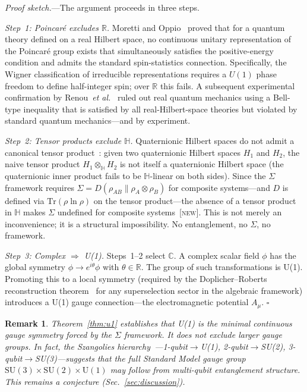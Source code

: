 \documentclass[prl,twocolumn,superscriptaddress,longbibliography]{revtex4-2}
\newtheorem*{remark}{Remark}
\newcommand{\Tr}{\mathrm{Tr}}
\newcommand{\new}{\textsc{[new]}}
\begin{document}
\textit{Proof sketch.}---The argument proceeds in three steps.

\textit{Step~1: Poincar\'{e} excludes $\mathbb{R}$.}
Moretti and Oppio~\cite{MorettiOppio2017,MorettiOppio2019}
proved that for a quantum theory defined on a real Hilbert space,
no continuous unitary representation of the Poincar\'{e} group
exists that simultaneously satisfies the positive-energy condition
and admits the standard spin-statistics connection.
Specifically, the Wigner classification of irreducible
representations requires a $U(1)$ phase freedom to define
half-integer spin; over $\mathbb{R}$ this fails.
A subsequent experimental confirmation by
Renou~\textit{et al.}~\cite{Renou2021} ruled out real quantum
mechanics using a Bell-type inequality that is satisfied by all
real-Hilbert-space theories but violated by standard quantum
mechanics---and by experiment.

\textit{Step~2: Tensor products exclude $\mathbb{H}$.}
Quaternionic Hilbert spaces do not admit a canonical tensor
product~\cite{AdelmanCortzen1969,Fernandez2003}: given two
quaternionic Hilbert spaces $H_1$ and $H_2$, the naive
tensor product $H_1 \otimes_{\mathbb{H}} H_2$ is not itself a
quaternionic Hilbert space (the quaternionic inner product fails
to be $\mathbb{H}$-linear on both sides).
Since the $\Sigma$ framework requires
$\Sigma = D(\rho_{AB} \| \rho_A \otimes \rho_B)$ for
composite systems---and $D$ is defined via $\Tr(\rho\ln\rho)$
on the tensor product---the absence of a tensor product in
$\mathbb{H}$ makes $\Sigma$ undefined for composite
systems~\new{}.
This is not merely an inconvenience; it is a structural
impossibility.
No entanglement, no $\Sigma$, no framework.

\textit{Step~3: Complex $\Rightarrow$ U(1).}
Steps~1--2 select $\mathbb{C}$.
A complex scalar field $\phi$ has the global symmetry
$\phi \to e^{i\theta}\phi$ with $\theta \in \mathbb{R}$.
The group of such transformations is U(1).
Promoting this to a local symmetry (required by the
Doplicher--Roberts reconstruction theorem~\cite{DoplicherRoberts1990}
for any superselection sector in the algebraic
framework)
introduces a U(1) gauge connection---the electromagnetic
potential $A_\mu$.
\hfill$\square$

\begin{remark}
Theorem~\ref{thm:u1} establishes that U(1) is the
\emph{minimal} continuous gauge symmetry forced by the
$\Sigma$ framework.
It does not exclude larger gauge groups.
In fact, the Szangolies
hierarchy~\cite{Szangolies2025}---1-qubit$\to$U(1),
2-qubit$\to$SU(2), 3-qubit$\to$SU(3)---suggests that the
full Standard Model gauge group
$\mathrm{SU}(3)\times\mathrm{SU}(2)\times\mathrm{U}(1)$
may follow from multi-qubit entanglement structure.
This remains a conjecture (Sec.~\ref{sec:discussion}).
\end{remark}
\end{document}
